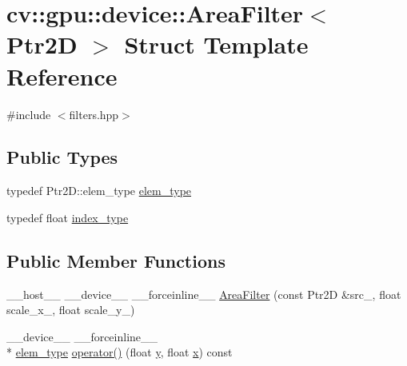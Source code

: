 \hypertarget{structcv_1_1gpu_1_1device_1_1AreaFilter}{\section{cv\-:\-:gpu\-:\-:device\-:\-:Area\-Filter$<$ Ptr2\-D $>$ Struct Template Reference}
\label{structcv_1_1gpu_1_1device_1_1AreaFilter}
}


{\ttfamily \#include $<$filters.\-hpp$>$}

\subsection*{Public Types}
\begin{DoxyCompactItemize}
\item 
typedef Ptr2\-D\-::elem\-\_\-type \hyperlink{structcv_1_1gpu_1_1device_1_1AreaFilter_afa9613c18da7af95c4efcfebce21595f}{elem\-\_\-type}
\item 
typedef float \hyperlink{structcv_1_1gpu_1_1device_1_1AreaFilter_a07abcdbb315d9e6ce77a17ec793591ea}{index\-\_\-type}
\end{DoxyCompactItemize}
\subsection*{Public Member Functions}
\begin{DoxyCompactItemize}
\item 
\-\_\-\-\_\-host\-\_\-\-\_\- \-\_\-\-\_\-device\-\_\-\-\_\- \-\_\-\-\_\-forceinline\-\_\-\-\_\- \hyperlink{structcv_1_1gpu_1_1device_1_1AreaFilter_ad4fd77617c731893fcb159e225c1b39a}{Area\-Filter} (const Ptr2\-D \&src\-\_\-, float scale\-\_\-x\-\_\-, float scale\-\_\-y\-\_\-)
\item 
\-\_\-\-\_\-device\-\_\-\-\_\- \-\_\-\-\_\-forceinline\-\_\-\-\_\- \\*
\hyperlink{structcv_1_1gpu_1_1device_1_1AreaFilter_afa9613c18da7af95c4efcfebce21595f}{elem\-\_\-type} \hyperlink{structcv_1_1gpu_1_1device_1_1AreaFilter_aac27ed4875b34188ff0409fe26b5f5da}{operator()} (float \hyperlink{highgui__c_8h_af1202c02b14870c18fb3a1da73e9e7c7}{y}, float \hyperlink{highgui__c_8h_a6150e0515f7202e2fb518f7206ed97dc}{x}) const 
\end{DoxyCompactItemize}
